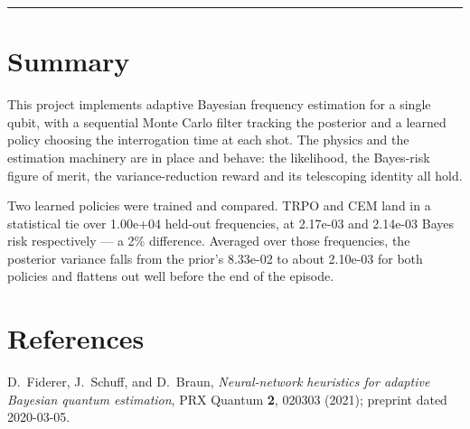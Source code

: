 \documentclass[12pt,a4paper]{article}
\begin{document}
\noindent\rule{\textwidth}{0.4pt}
\FloatBarrier

\section{Summary}
\label{sec:summary}
This project implements adaptive Bayesian frequency estimation for a single
qubit, with a sequential Monte Carlo filter tracking the posterior and a
learned policy choosing the interrogation time at each shot. The physics and
the estimation machinery are in place and behave: the likelihood, the
Bayes-risk figure of merit, the variance-reduction reward and its
telescoping identity all hold.

Two learned policies were trained and compared. TRPO and CEM land in a
statistical tie over 1.00e+04 held-out frequencies, at 2.17e-03 and 2.14e-03
Bayes risk respectively --- a 2\% difference. Averaged over those
frequencies, the posterior variance falls from the prior's 8.33e-02 to about
2.10e-03 for both policies and flattens out well before the end of the
episode.

\section*{References}

D.~Fiderer, J.~Schuff, and D.~Braun, \emph{Neural-network heuristics for
adaptive Bayesian quantum estimation}, PRX Quantum \textbf{2}, 020303
(2021); preprint dated 2020-03-05.
\end{document}
